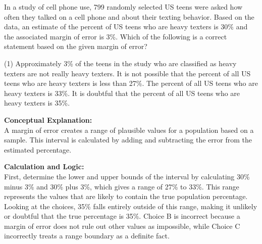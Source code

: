 \documentclass[11pt,paper=a4,answers]{exam}
\begin{document}
\begin{questions}
\pointsinrightmargin
\pointsdroppedatright
\marksnotpoints
{}
\pointformat{\boldmath\themarginpoints}
\bracketedpoints



\question
In a study of cell phone use, 799 randomly selected US teens were asked how often they talked on a cell phone and about their texting behavior. Based on the data, an estimate of the percent of US teens who are heavy texters is 30\% and the associated margin of error is 3\%. Which of the following is a correct statement based on the given margin of error?
\begin{tasks}(1)
    \task Approximately 3\% of the teens in the study who are classified as heavy texters are not really heavy texters.
    \task It is not possible that the percent of all US teens who are heavy texters is less than 27\%.
    \task The percent of all US teens who are heavy texters is 33\%.
    \task It is doubtful that the percent of all US teens who are heavy texters is 35\%.
\end{tasks}

\begin{solution}
\textbf{Conceptual Explanation:} \\
A margin of error creates a range of plausible values for a population based on a sample. This interval is calculated by adding and subtracting the error from the estimated percentage.

\vspace{30pt}

\textbf{Calculation and Logic:} \\
First, determine the lower and upper bounds of the interval by calculating 30\% minus 3\% and 30\% plus 3\%, which gives a range of 27\% to 33\%. This range represents the values that are likely to contain the true population percentage. Looking at the choices, 35\% falls entirely outside of this range, making it unlikely or doubtful that the true percentage is 35\%. Choice B is incorrect because a margin of error does not rule out other values as impossible, while Choice C incorrectly treats a range boundary as a definite fact.


\end{solution}
\end{questions}
\end{document}
